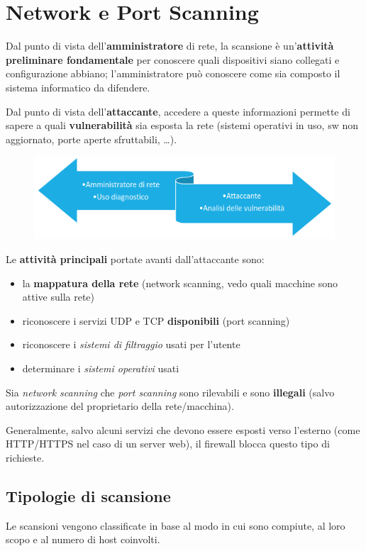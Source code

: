 \chapter{Network e Port Scanning}
Dal punto di vista dell'\textbf{amministratore} di rete, la scansione è 
un'\textbf{attività preliminare fondamentale} per conoscere quali dispositivi siano 
collegati e configurazione abbiano; l'amministratore può conoscere come sia composto 
il sistema informatico da difendere.

\noindent Dal punto di vista dell'\textbf{attaccante}, accedere a queste informazioni 
permette di sapere a quali \textbf{vulnerabilità} sia esposta la rete (sistemi operativi 
in uso, sw non aggiornato, porte aperte sfruttabili, \dots).

\begin{figure}[H]
    \centering
    \includegraphics[width=0.9\linewidth]{chapters/9/images/intro.png}
\end{figure}

Le \textbf{attività principali} portate avanti dall'attaccante sono:
\begin{itemize}
    \item la \textbf{mappatura della rete} (network scanning, vedo quali macchine sono attive sulla rete)
    \item riconoscere i servizi UDP e TCP \textbf{disponibili} (port scanning)
    \item riconoscere i \textit{sistemi di filtraggio} usati per l'utente 
    \item determinare i \textit{sistemi operativi} usati 
\end{itemize}

\noindent Sia \textit{network scanning} che \textit{port scanning} sono rilevabili e sono \textbf{illegali}
(salvo autorizzazione del proprietario della rete/macchina).

\noindent Generalmente, salvo alcuni servizi che devono essere esposti verso 
l'esterno (come HTTP/HTTPS nel caso di un server web), il firewall blocca 
questo tipo di richieste.

\section{Tipologie di scansione}
Le scansioni vengono classificate in base al modo in cui sono compiute, al loro scopo e 
al numero di host coinvolti.

